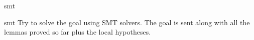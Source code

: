 \begin{tactic}{smt}
  \begin{tsyntax}[empty]{smt}
  Try to solve the goal using SMT solvers. The goal is sent along with all the
  lemmas proved so far plus the local hypotheses.
  \end{tsyntax}
\end{tactic}
